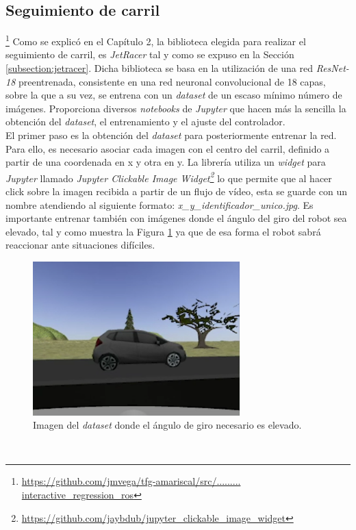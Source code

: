\subsection{Seguimiento de carril}
\label{subsection:lanefollower}
\footnote{\url{https://github.com/jmvega/tfg-amariscal/src/......... interactive_regression_ros}}
Como se explicó en el Capítulo 2, la biblioteca elegida para realizar el seguimiento de carril, es \textit{JetRacer} tal y como se expuso en la Sección \ref{subsection:jetracer}.
Dicha biblioteca se basa en la utilización de una red \textit{ResNet-18} preentrenada, consistente en una red neuronal convolucional de 18 capas, sobre la que a su vez, se entrena
con un \textit{dataset} de un escaso mínimo número de imágenes. Proporciona diversos \textit{notebooks} de \textit{Jupyter} que hacen más la sencilla la obtención del
\textit{dataset}, el entrenamiento y el ajuste del controlador.\\

El primer paso es la obtención del \textit{dataset} para posteriormente entrenar la red. Para ello, es necesario asociar cada imagen con el centro del carril, definido a partir de
una coordenada en x y otra en y. La librería utiliza un \textit{widget} para \textit{Jupyter} llamado \textit{Jupyter Clickable Image
	Widget\footnote{\url{https://github.com/jaybdub/jupyter_clickable_image_widget}}} lo que permite que al hacer click sobre la imagen recibida a partir de un flujo de vídeo, esta se
guarde con un nombre atendiendo al siguiente formato: \textit{x\_y\_identificador\_unico.jpg}. Es importante entrenar también con imágenes donde el ángulo del giro del robot sea
elevado, tal y como muestra la Figura \ref{fig:traineddifficult} ya que de esa forma el robot sabrá reaccionar ante situaciones difíciles.\\

\begin{figure} [h!]
	\begin{center}
		\includegraphics[width=8cm]{figs/trainedDifficult}
	\end{center}
	\caption{Imagen del \textit{dataset} donde el ángulo de giro necesario es elevado.}
	\label{fig:traineddifficult}
\end{figure}\

